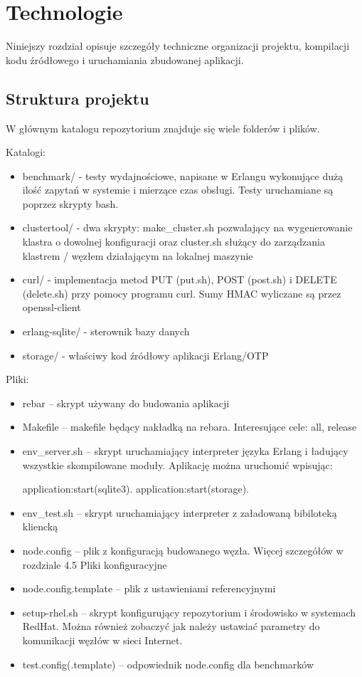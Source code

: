 \section{Technologie}
Niniejszy rozdział opisuje szczegóły techniczne organizacji projektu, kompilacji kodu źródłowego i uruchamiania zbudowanej aplikacji.

\subsection{Struktura projektu}
W głównym katalogu repozytorium znajduje się wiele folderów i plików.

Katalogi:
\begin{itemize}
	\item benchmark/ - testy wydajnościowe, napisane w Erlangu wykonujące dużą ilość zapytań w systemie i mierzące czas obsługi. Testy uruchamiane są poprzez skrypty bash.
	\item clustertool/ - dwa skrypty: make\_cluster.sh pozwalający na wygenerowanie klastra o dowolnej konfiguracji oraz cluster.sh służący do zarządzania klastrem / węzłem działającym na lokalnej maszynie
	\item curl/ - implementacja metod PUT (put.sh), POST (post.sh) i DELETE (delete.sh) przy pomocy programu curl. Sumy HMAC wyliczane są przez openssl-client
	\item erlang-sqlite/ - sterownik bazy danych
	\item storage/ - właściwy kod źródłowy aplikacji Erlang/OTP
\end{itemize}

Pliki:
\begin{itemize}
	\item rebar – skrypt używany do budowania aplikacji
	\item Makefile – makefile będący nakładką na rebara. Interesujące cele: all, release
	\item env\_server.sh – skrypt uruchamiający interpreter języka Erlang i ładujący wszystkie skompilowane moduły. Aplikację można uruchomić wpisując:
	
	application:start(sqlite3).
	application:start(storage).
	\item env\_test.sh – skrypt uruchamiający interpreter z załadowaną bibiloteką kliencką
	\item node.config – plik z konfiguracją budowanego węzła. Więcej szczegółów w rozdziale 4.5 Pliki konfiguracyjne
	\item node.config.template – plik z ustawieniami referencyjnymi
	\item setup-rhel.sh – skrypt konfigurujący repozytorium i środowisko w systemach RedHat. Można również zobaczyć jak należy ustawiać parametry do komunikacji węzłów w sieci Internet.
	\item test.config(.template) – odpowiednik node.config dla benchmarków
\end{itemize}


